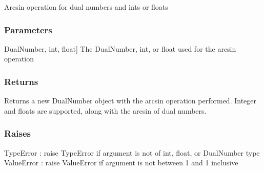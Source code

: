 \documentclass[letterpaper,10pt,english]{sphinxmanual}
\begin{document}

\begin{fulllineitems}
\label{\detokenize{autodiff:autodiff.operators.arcsin}}
\pysigstartsignatures
{}
\pysigstopsignatures
\sphinxAtStartPar
Arcsin operation for dual numbers and ints or floats


\subsubsection{Parameters}
\label{\detokenize{autodiff:id9}}\begin{description}
\sphinxlineitem{x}{[}DualNumber, int, float{]}
\sphinxAtStartPar
The DualNumber, int, or float used for the arcsin operation

\end{description}


\subsubsection{Returns}
\label{\detokenize{autodiff:id10}}\begin{description}
\sphinxAtStartPar
Returns a new DualNumber object with the arcsin operation performed. Integer and
floats are supported, along with the arcsin of dual numbers.

\end{description}


\subsubsection{Raises}
\label{\detokenize{autodiff:id11}}
\sphinxAtStartPar
TypeError : raise TypeError if argument is not of int, float, or DualNumber type
ValueError : raise ValueError if argument is not between \sphinxhyphen{}1 and 1 inclusive

\end{fulllineitems}

\end{document}
